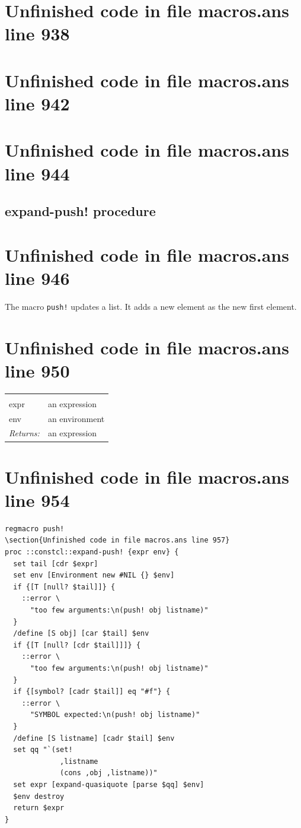 \documentclass[twoside,9pt]{report}
\begin{document}
\section{Unfinished code in file macros.ans line 938}
\section{Unfinished code in file macros.ans line 942}
\section{Unfinished code in file macros.ans line 944}
\subsection{expand-push! procedure}
\label{expand-push"!-procedure}
\section{Unfinished code in file macros.ans line 946}


The macro \texttt{push!} updates a list. It adds a new element as the new first element.

\section{Unfinished code in file macros.ans line 950}
\noindent\begin{tabular}{ |p{1.9cm} p{8cm}| }
\hline
\rowcolor[HTML]{CCCCCC} \multicolumn{2}{|l|}{\bf expand-push! (internal)} \\
expr & an expression \\
env & an environment \\
\textit{Returns:} & an expression \\
\hline
\end{tabular}
\section{Unfinished code in file macros.ans line 954}
\begin{lstlisting}
regmacro push!
\section{Unfinished code in file macros.ans line 957}
proc ::constcl::expand-push! {expr env} {
  set tail [cdr $expr]
  set env [Environment new #NIL {} $env]
  if {[T [null? $tail]]} {
    ::error \
      "too few arguments:\n(push! obj listname)"
  }
  /define [S obj] [car $tail] $env
  if {[T [null? [cdr $tail]]]} {
    ::error \
      "too few arguments:\n(push! obj listname)"
  }
  if {[symbol? [cadr $tail]] eq "#f"} {
    ::error \
      "SYMBOL expected:\n(push! obj listname)"
  }
  /define [S listname] [cadr $tail] $env
  set qq "`(set!
             ,listname
             (cons ,obj ,listname))"
  set expr [expand-quasiquote [parse $qq] $env]
  $env destroy
  return $expr
}
\end{lstlisting}
\end{document}

